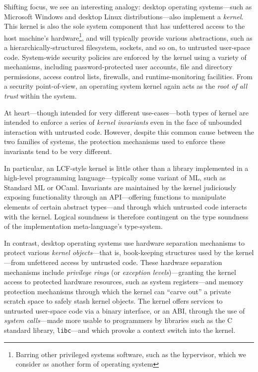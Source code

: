 \documentclass[a4paper, 10pt]{article}
\begin{document}
Shifting focus, we see an interesting analogy: desktop operating systems---such as Microsoft Windows and desktop Linux distributions---also implement a \emph{kernel}.
This kernel is also the sole system component that has unfettered access to the host machine's hardware\footnote{Barring other privileged systems software, such as the hypervisor, which we consider as another form of operating system}, and will typically provide various abstractions, such as a hierarchically-structured filesystem, sockets, and so on, to untrusted user-space code.
System-wide security policies are enforced by the kernel using a variety of mechanisms, including password-protected user accounts, file and directory permissions, access control lists, firewalls, and runtime-monitoring facilities.
From a security point-of-view, an operating system kernel again acts as the \emph{root of all trust} within the system.

At heart---though intended for very different use-cases---both types of kernel are intended to enforce a series of \emph{kernel invariants} even in the face of unbounded interaction with untrusted code.
However, despite this common cause between the two families of systems, the protection mechanisms used to enforce these invariants tend to be very different.

In particular, an LCF-style kernel is little other than a library implemented in a high-level programming language---typically some variant of ML, such as Standard ML or OCaml.
Invariants are maintained by the kernel judiciously exposing functionality through an API---offering functions to manipulate elements of certain abstract types---and through which untrusted code interacts with the kernel.
Logical soundness is therefore contingent on the type soundness of the implementation meta-language's type-system.

In contrast, desktop operating systems use hardware separation mechanisms to protect various \emph{kernel objects}---that is, book-keeping structures used by the kernel---from unfettered access by untrusted code.
These hardware separation mechanisms include \emph{privilege rings} (or \emph{exception levels})---granting the kernel access to protected hardware resources, such as system registers---and memory protection mechanisms through which the kernel can ``carve out'' a private scratch space to safely stash kernel objects.
The kernel offers services to untrusted user-space code via a binary interface, or an ABI, through the use of \emph{system calls}---made more usable to programmers by libraries such as the C standard library, \texttt{libc}---and which provoke a context switch into the kernel.
\end{document}
